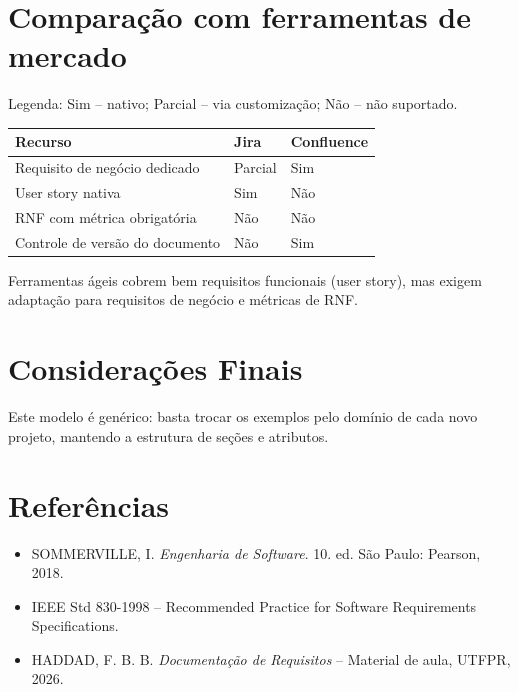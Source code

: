 \documentclass[12pt,a4paper]{article}
\begin{document}
\section{Comparação com ferramentas de mercado}
Legenda: \colorbox{simCor}{Sim} -- nativo; \colorbox{parcialCor}{Parcial} -- via customização; \colorbox{naoCor}{Não} -- não suportado.

\begin{longtable}{L{5cm} C{3cm} C{3cm}}
\toprule
{}
\textbf{Recurso} & \textbf{Jira} & \textbf{Confluence} \\
\midrule
Requisito de negócio dedicado & Parcial & Sim \\
User story nativa & Sim & Não \\
RNF com métrica obrigatória & Não & Não \\
Controle de versão do documento & Não & Sim \\
\bottomrule
\end{longtable}

Ferramentas ágeis cobrem bem requisitos funcionais (user story), mas exigem adaptação para requisitos de negócio e métricas de RNF.

\section{Considerações Finais}
Este modelo é genérico: basta trocar os exemplos pelo domínio de cada novo projeto, mantendo a estrutura de seções e atributos.

\section*{Referências}
\begin{itemize}[nosep]
    \item SOMMERVILLE, I. \textit{Engenharia de Software}. 10. ed. São Paulo: Pearson, 2018.
    \item IEEE Std 830-1998 -- Recommended Practice for Software Requirements Specifications.
    \item HADDAD, F. B. B. \textit{Documentação de Requisitos} -- Material de aula, UTFPR, 2026.
\end{itemize}
\end{document}

